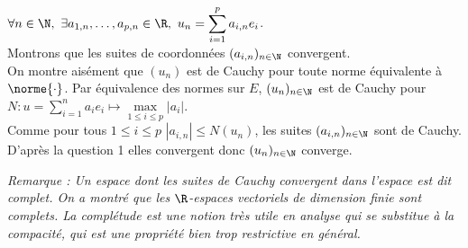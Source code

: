 \documentclass{book}
\begin{document}
\begin{enumerate}[leftmargin=*]
		$\forall n\in \N,\ \exists a_{1,n},\dots,a_{p,n}\in \R,\ u_n=\displaystyle\sum_{i=1}^pa_{i,n}e_i$.\\
		Montrons que les suites de coordonnées $(a_{i,n})_{n\in \N}$ convergent.\\
		On montre aisément que $(u_n)$ est de Cauchy pour toute norme équivalente à $\norme{\cdot}$. Par équivalence des normes sur $E$, $(u_n)_{n\in \N}$ est de Cauchy pour $N:u=\displaystyle\sum_{i=1}^na_ie_i\mapsto \max\limits_{1\leq i\leq p}|a_i|$.\\
		Comme pour tous $1\leq i\leq p$ $|a_{i,n}|\leq N(u_n)$, les suites $(a_{i,n})_{n\in \N}$ sont de Cauchy. D'après la question 1 elles convergent donc $(u_n)_{n\in \N}$ converge.
	\end{enumerate}
	\textit{Remarque : Un espace dont les suites de Cauchy convergent dans l'espace est dit complet. On a montré que les $\R$-espaces vectoriels de dimension finie sont complets. La complétude est une notion très utile en analyse qui se substitue à la compacité, qui est une propriété bien trop restrictive en général.}
	
\end{document}
